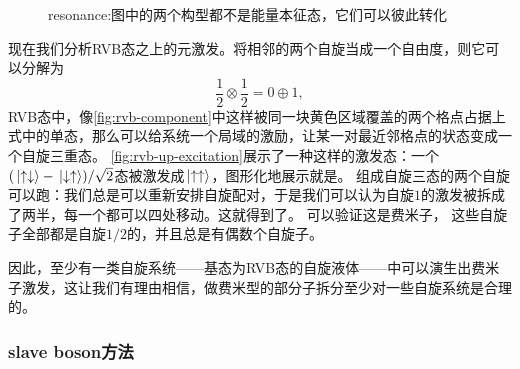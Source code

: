 \begin{figure}
    \centering
    
    \caption{resonance:图中的两个构型都不是能量本征态，它们可以彼此转化}
    \label{fig:rvb-resonance}
\end{figure}

现在我们分析RVB态之上的元激发。将相邻的两个自旋当成一个自由度，则它可以分解为
\begin{equation}
    \frac{1}{2} \otimes \frac{1}{2} = 0 \oplus 1,
\end{equation}
RVB态中，像\autoref{fig:rvb-component}中这样被同一块黄色区域覆盖的两个格点占据上式中的单态，那么可以给系统一个局域的激励，让某一对最近邻格点的状态变成一个自旋三重态。
\autoref{fig:rvb-up-excitation}展示了一种这样的激发态：一个$(\ket*{\uparrow \downarrow} - \ket*{\downarrow \uparrow}) / \sqrt{2}$态被激发成$\ket*{\uparrow \uparrow}$，图形化地展示就是。
组成自旋三态的两个自旋可以跑：我们总是可以重新安排自旋配对，于是我们可以认为自旋$1$的激发被拆成了两半，每一个都可以四处移动。这就得到了。
可以验证这是费米子，%
这些自旋子全部都是自旋$1/2$的，并且总是有偶数个自旋子。

因此，至少有一类自旋系统——基态为RVB态的自旋液体——中可以演生出费米子激发，这让我们有理由相信，做费米型的部分子拆分至少对一些自旋系统是合理的。

\subsubsection{slave boson方法}

